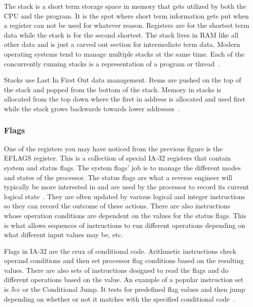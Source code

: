 \documentclass[12pt]{article}
\begin{document}
The stack is a short term storage space in memory that gets utilized by both the CPU and the program. It is the spot where short term information gets put when a register can not be used for whatever reason. Registers are for the shortest term data while the stack is for the second shortest. The stack lives in RAM like all other data and is just a carved out section for intermediate term data. Modern operating systems tend to manage multiple stacks at the same time. Each of the concurrently running stacks is a representation of a program or thread~\cite{MasteringRE}.

Stacks use Last In First Out data management. Items are pushed on the top of the stack and popped from the bottom of the stack. Memory in stacks is allocated from the top down where the first in address is allocated and used first while the stack grows backwards towards lower addresses~\cite{Reversing}.

\subsubsection{Flags}
One of the registers you may have noticed from the previous figure is the EFLAGS register. This is a collection of special IA-32 registers that contain system and status flags. The system flags’ job is to manage the different modes and states of the processor. The status flags are what a reverse engineer will typically be more interested in and are used by the processor to record its current logical state~\cite{Reversing}. They are often updated by various logical and integer instructions so they can record the outcome of these actions. There are also instructions whose operation conditions are dependent on the values for the status flags. This is what allows sequences of instructions to run different operations depending on what different input values may be, etc. 

Flags in IA-32 are the crux of conditional code. Arithmetic instructions check operand conditions and then set processor flag conditions based on the resulting values. There are also sets of instructions designed to read the flags and do different operations based on the value. An example of a popular instruction set is Jcc or the Conditional Jump. It tests for predefined flag values and then jump depending on whether or not it matches with the specified conditional code~\cite{intelManual}.
\end{document}
